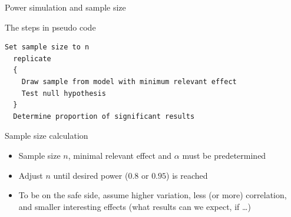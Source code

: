 \documentclass[aspectratio=169]{beamer}
\begin{document}


\begin{frame}[fragile]{Power simulation and sample size}

The steps in pseudo code\\[1ex]

\begin{lstlisting}[style=numbers]
  Set sample size to n
  replicate
  {
    Draw sample from model with minimum relevant effect
    Test null hypothesis
  }
  Determine proportion of significant results
\end{lstlisting}

\vspace{2ex}

Sample size calculation\\[1ex]

\begin{itemize}
\item Sample size $n$, minimal relevant effect and $\alpha$ must be
predetermined

\item Adjust $n$ until desired power ($0.8$ or $0.95$) is reached

\item To be on the safe side, assume higher variation, less (or more)
correlation, and smaller interesting effects (what results can we expect, if
\dots)
\end{itemize}

\end{frame}
\end{document}
